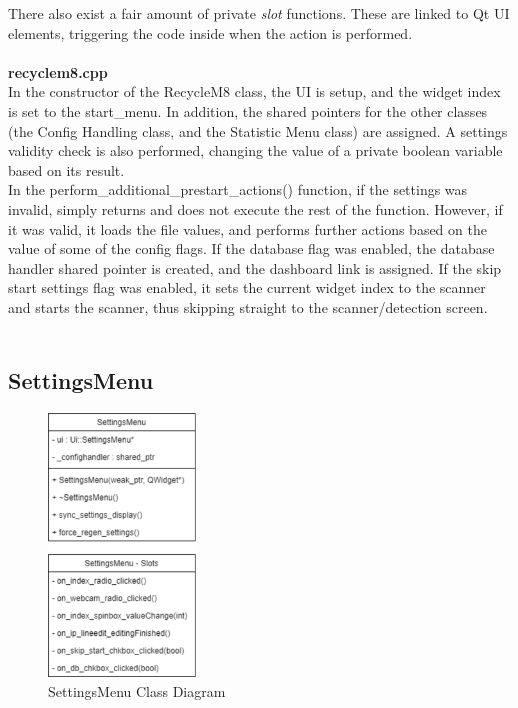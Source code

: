 \documentclass[conference]{IEEEtran}
\begin{document}
There also exist a fair amount of private \textit{slot} functions. These are linked to Qt UI elements, triggering the code inside when the action is performed. ~\\~\\


\textbf{recyclem8.cpp}~\\

In the constructor of the RecycleM8 class, the UI is setup, and the widget index is set to the start\_menu. In addition, the shared pointers for the other classes (the Config Handling class, and the Statistic Menu class) are assigned. A settings validity check is also performed, changing the value of a private boolean variable based on its result.\\


In the perform\_additional\_prestart\_actions() function, if the settings was invalid, simply returns and does not execute the rest of the function. However, if it was valid, it loads the file values, and performs further actions based on the value of some of the config flags. If the database flag was enabled, the database handler shared pointer is created, and the dashboard link is assigned. If the skip start settings flag was enabled, it sets the current widget index to the scanner and starts the scanner, thus skipping straight to the scanner/detection screen.~\\~\\

\subsection{SettingsMenu}

\begin{figure}[h]
    \centering
    \includegraphics[width=0.35\textwidth]{images/code_diagrams/settingsmenu.eps}
    \caption{SettingsMenu Class Diagram}
\end{figure}~\\
\end{document}
